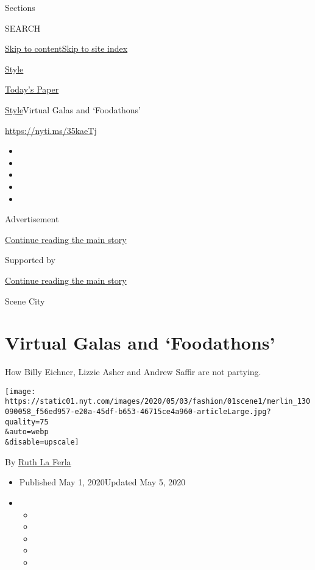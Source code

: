 Sections

SEARCH

\protect\hyperlink{site-content}{Skip to
content}\protect\hyperlink{site-index}{Skip to site index}

\href{https://www.nytimes.com/section/style}{Style}

\href{https://myaccount.nytimes.com/auth/login?response_type=cookie\&client_id=vi}{}

\href{https://www.nytimes.com/section/todayspaper}{Today's Paper}

\href{/section/style}{Style}\textbar{}Virtual Galas and `Foodathons'

\url{https://nyti.ms/35kaeTj}

\begin{itemize}
\item
\item
\item
\item
\item
\end{itemize}

Advertisement

\protect\hyperlink{after-top}{Continue reading the main story}

Supported by

\protect\hyperlink{after-sponsor}{Continue reading the main story}

Scene City

\hypertarget{virtual-galas-and-foodathons}{%
\section{Virtual Galas and
`Foodathons'}\label{virtual-galas-and-foodathons}}

How Billy Eichner, Lizzie Asher and Andrew Saffir are not partying.

\texttt{[image: https://static01.nyt.com/images/2020/05/03/fashion/01scene1/merlin\_130090058\_f56ed957-e20a-45df-b653-46715ce4a960-articleLarge.jpg?quality=75\\\&auto=webp\\\&disable=upscale]}

By \href{https://www.nytimes.com/by/ruth-la-ferla}{Ruth La Ferla}

\begin{itemize}
\item
  Published May 1, 2020Updated May 5, 2020
\item
  \begin{itemize}
  \item
  \item
  \item
  \item
  \item
  \end{itemize}
\end{itemize}

